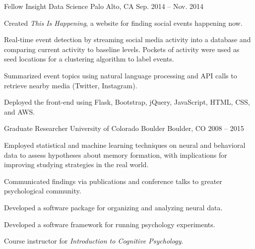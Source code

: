 \begin{cventries}
  \cventry
    {Fellow} %
    {Insight Data Science} %
    {Palo Alto, CA} %
    {Sep. 2014 -- Nov. 2014} %
    {
      \begin{cvitems} %
        \item {Created \textit{This Is Happening}, a website for finding social events happening now.}
        \item {Real-time event detection by streaming social media activity into a database and comparing current activity to baseline levels.  Pockets of activity were used as seed locations for a clustering algorithm to label events.}
        \item {Summarized event topics using natural language processing and API calls to retrieve nearby media (Twitter, Instagram).}
        \item {Deployed the front-end using Flask, Bootstrap, jQuery, JavaScript, HTML, CSS, and AWS.}
      \end{cvitems}
    }

  \cventry
    {Graduate Researcher} %
    {University of Colorado Boulder} %
    {Boulder, CO} %
    {2008 -- 2015} %
    {
      \begin{cvitems} %
        \item {Employed statistical and machine learning techniques on neural and behavioral data to assess hypotheses about memory formation, with implications for improving studying strategies in the real world.}
        \item {Communicated findings via publications and conference talks to greater psychological community.}
        \item {Developed a software package for organizing and analyzing neural data.}
        \item {Developed a software framework for running psychology experiments.}
        \item {Course instructor for \textit{Introduction to Cognitive Psychology}.}
      \end{cvitems}
    }


\end{cventries}
